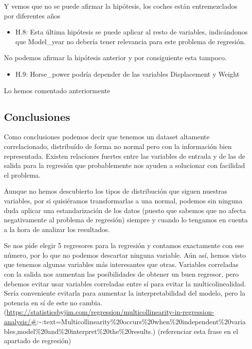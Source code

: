 Y vemos que no se puede afirmar la hipótesis, los coches están entremezclados por diferentes años

\begin{itemize}
\item H.8: Esta última hipótesis se puede aplicar al resto de variables, indicándonos que Model\_year no debería tener relevancia para este problema de regresión.
\end{itemize}

No podemos afirmar la hipótesis anterior y por consiguiente esta tampoco.

\begin{itemize}
\item H.9: Horse\_power podría depender de las variables Displacement y Weight
\end{itemize}

Lo hemos comentado anteriormente

\subsection{Conclusiones}

Como conclusiones podemos decir que tenemos un dataset altamente correlacionado, distribuído de forma no normal pero con la información bien representada. Existen relaciones fuertes entre las variables de entrada y de las de salida para la regresión que probablemente nos ayuden a solucionar con facilidad el problema.

Aunque no hemos descubierto los tipos de distribución que siguen nuestras variables, por si quisiéramos transformarlas a una normal, podemos sin ninguna duda aplicar una estandarización de los datos (puesto que sabemos que no afecta negativamente al problema de regresión) siempre y cuando lo tengamos en cuenta a la hora de analizar los resultados.

Se nos pide elegir 5 regresores para la regresión y contamos exactamente con ese número, por lo que no podemos descartar ninguna variable. Aún así, hemos visto que tenemos algunas variables más interesantes que otras. Variables correladas con la salida nos aumentan las posibilidades de obtener un buen regresor, pero debemos evitar usar variables correladas entre sí para evitar la multicolinealidad. Sería conveniente evitarla para aumentar la interpretabilidad del modelo, pero la potencia en sí de este no cambia. (\url{https://statisticsbyjim.com/regression/multicollinearity-in-regression-analysis/\#}:\textasciitilde:text=Multicollinearity\%20occurs\%20when\%20independent\%20variables,model\%20and\%20interpret\%20the\%20results.) (referenciar esta frase en el apartado de regresión)